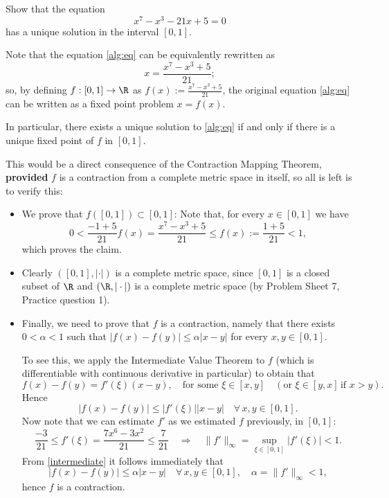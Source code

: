 \np

\begin{example}
Show that the equation 
\begin{equation}\label{alg:eq}
x^7 - x^3 -21 x+5 =0
\end{equation}
has a unique solution in the interval $[0,1]$.
\bis

Note that the equation \eqref{alg:eq} can be equivalently rewritten as 
\begin{equation}
x= \frac{x^7 - x^3 +5}{21};
\end{equation}
so, by defining $f:[0,1] \to \R$ as $f(x):= \frac{x^7 - x^3 +5}{21}$, the original equation \eqref{alg:eq} can be written as a fixed point problem $x=f(x)$.

In particular, there exists a unique solution to \eqref{alg:eq} if and only if there is a unique fixed point of $f$ in $[0,1]$.
\medskip

This would be a direct consequence of the Contraction Mapping Theorem, \textbf{provided} $f$ is a contraction from a complete metric space in itself, so all is left is to verify this:

\begin{itemize}
\item We prove that $f([0,1])\subset [0,1]$: Note that, for every $x\in [0,1]$ we have
$$
0< \frac{- 1 +5}{21} f(x)= \frac{x^7 - x^3 +5}{21} \leq f(x):= \frac{1+5}{21} <1,
$$
which proves the claim.

\item Clearly $([0,1],|\cdot|)$ is a complete metric space, since $[0,1]$ is a closed subset of $\R$ and $(\R,|\cdot|)$ is a complete metric space (by Problem Sheet 7, Practice question 1).

\item Finally, we need to prove that $f$ is a contraction, namely that there exists $0<\alpha<1$ such that $|f(x) - f(y)| \leq \alpha |x-y|$ for every $x,y\in [0,1]$.

To see this, we apply the Intermediate Value Theorem to $f$ (which is differentiable with continuous derivative in particular) to obtain that 
$$
f(x) - f(y) = f'(\xi)(x-y), \quad \textrm{for some }  \xi \in [x,y] \quad (\textrm{or } \xi \in [y,x] \, \textrm{if } x>y).
$$
Hence
\begin{equation}\label{intermediate}
|f(x) - f(y)| \leq |f'(\xi)| |x-y| \quad \forall\, x,y \in [0,1].
\end{equation}%
Now note that we can estimate $f'$ as we estimated $f$ previously, in $[0,1]$:
$$
 \frac{- 3}{21} \leq f'(\xi) = \frac{7x^6 - 3x^2}{21} \leq  \frac{7}{21} \quad \Rightarrow \quad \|f'\|_{\infty} = \sup_{\xi\in [0,1]} |f'(\xi)| <1.
$$
From \eqref{intermediate} it follows immediately that 
$$
|f(x) - f(y)| \leq \alpha |x-y| \quad \forall\, x,y \in [0,1], \quad \alpha = \|f'\|_{\infty} <1,
$$
hence $f$ is a contraction.
\end{itemize}
\end{example}

